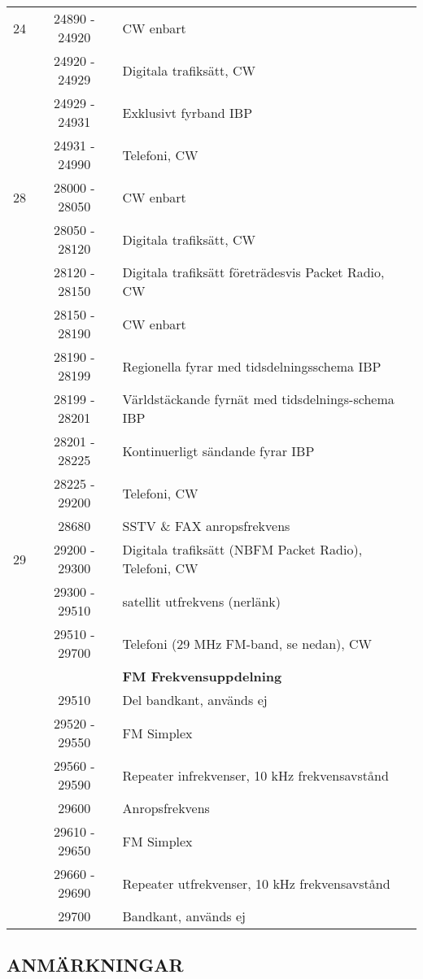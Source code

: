 \begin{longtable}{lcl}
24   & 24890 - 24920 & CW enbart \\
     & 24920 - 24929 & Digitala trafiksätt, CW \\
     & 24929 - 24931 & Exklusivt fyrband IBP \\
     & 24931 - 24990 & Telefoni, CW \\

28   & 28000 - 28050 & CW enbart \\
     & 28050 - 28120 & Digitala trafiksätt, CW \\
     & 28120 - 28150 & Digitala trafiksätt företrädesvis Packet Radio, CW \\
     & 28150 - 28190 & CW enbart \\
     & 28190 - 28199 & Regionella fyrar med tidsdelningsschema IBP \\
     & 28199 - 28201 & Världstäckande fyrnät med tidsdelnings-schema IBP \\
     & 28201 - 28225 & Kontinuerligt sändande fyrar IBP \\
     & 28225 - 29200 & Telefoni, CW \\
     & 28680         & SSTV \& FAX anropsfrekvens \\

29   & 29200 - 29300 & Digitala trafiksätt (NBFM Packet Radio), Telefoni, CW \\
     & 29300 - 29510 & satellit utfrekvens (nerlänk) \\
     & 29510 - 29700 & Telefoni (29 MHz FM-band, se nedan), CW \\
     &               & \textbf{FM Frekvensuppdelning} \\
     & 29510         & Del bandkant, används ej \\
     & 29520 - 29550 & FM Simplex \\
     & 29560 - 29590 & Repeater infrekvenser, 10 kHz frekvensavstånd \\
     & 29600         & Anropsfrekvens \\
     & 29610 - 29650 & FM Simplex \\
     & 29660 - 29690 & Repeater utfrekvenser, 10 kHz frekvensavstånd \\
     & 29700         & Bandkant, används ej \\
\end{longtable}

\subsection{ANMÄRKNINGAR}

